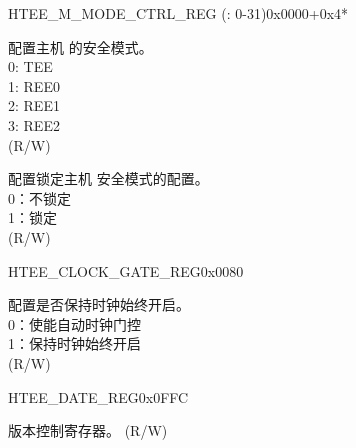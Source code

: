 \begin{register}{H}{TEE\_M\_MODE\_CTRL\_REG (: 0-31)}{0x0000+0x4*}\label{regdesc:TEEMNMODECTRLREG}
%
%
%
\regnewline%
\begin{regdesc}\begin{reglist}
\label{fielddesc:TEEMNMODE}\item [TEE\_M\regindex{n}\_MODE] 配置主机  的安全模式。\\
0: TEE \\
1: REE0 \\
2: REE1 \\
3: REE2  \\
(R/W)
\label{fielddesc:TEEMNLOCK}\item [TEE\_M\regindex{n}\_LOCK] 配置锁定主机  安全模式的配置。\\
0：不锁定 \\
1：锁定  \\ (R/W)
\end{reglist}\end{regdesc}
\end{register}


\begin{register}{H}{TEE\_CLOCK\_GATE\_REG}{0x0080}\label{regdesc:TEECLOCKGATEREG}
%
%
\regnewline%
\begin{regdesc}\begin{reglist}
\label{fielddesc:TEECLKEN}\item [TEE\_CLK\_EN] 配置是否保持时钟始终开启。\\
0：使能自动时钟门控 \\
1：保持时钟始终开启 \\ (R/W)
\end{reglist}\end{regdesc}
\end{register}


\begin{register}{H}{TEE\_DATE\_REG}{0x0FFC}\label{regdesc:TEEDATEREG}
%
%
\regnewline%
\begin{regdesc}\begin{reglist}
\label{fielddesc:TEEDATE}\item [TEE\_DATE] 版本控制寄存器。 (R/W)
\end{reglist}\end{regdesc}
\end{register}


